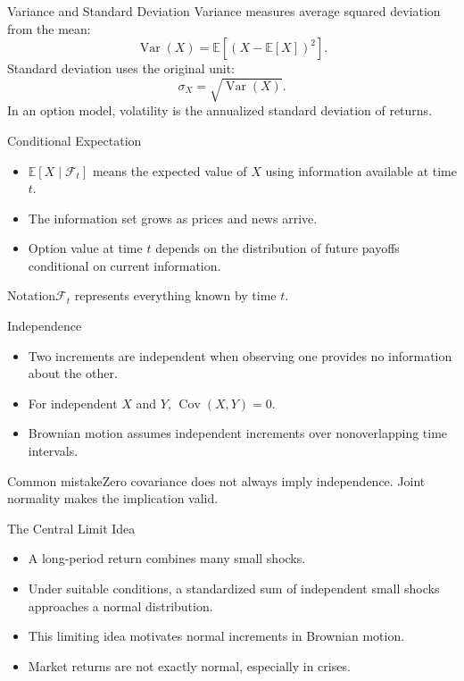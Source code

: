 \documentclass[aspectratio=169]{beamer}
\newcommand{\E}{\mathbb{E}}
\newcommand{\Var}{\operatorname{Var}}
\newcommand{\Cov}{\operatorname{Cov}}
\begin{document}
\begin{frame}[t]{Variance and Standard Deviation}
\justifying
Variance measures average squared deviation from the mean:
\[\Var(X)=\E[(X-\E[X])^2].\]
Standard deviation uses the original unit:
\[\sigma_X=\sqrt{\Var(X)}.\]
In an option model, volatility is the annualized standard deviation of returns.
\end{frame}

\begin{frame}[t]{Conditional Expectation}
\justifying
\begin{itemize}
\item $\E[X\mid\mathcal F_t]$ means the expected value of $X$ using information available at time $t$.
\item The information set grows as prices and news arrive.
\item Option value at time $t$ depends on the distribution of future payoffs conditional on current information.
\end{itemize}\begin{block}{Notation}$\mathcal F_t$ represents everything known by time $t$.\end{block}
\end{frame}

\begin{frame}[t]{Independence}
\justifying
\begin{itemize}
\item Two increments are independent when observing one provides no information about the other.
\item For independent $X$ and $Y$, $\Cov(X,Y)=0$.
\item Brownian motion assumes independent increments over nonoverlapping time intervals.
\end{itemize}\begin{alertblock}{Common mistake}Zero covariance does not always imply independence. Joint normality makes the implication valid.\end{alertblock}
\end{frame}

\begin{frame}[t]{The Central Limit Idea}
\justifying
\begin{itemize}
\item A long-period return combines many small shocks.
\item Under suitable conditions, a standardized sum of independent small shocks approaches a normal distribution.
\item This limiting idea motivates normal increments in Brownian motion.
\item Market returns are not exactly normal, especially in crises.
\end{itemize}
\end{frame}
\end{document}
